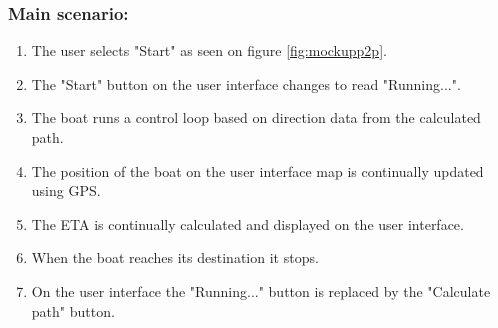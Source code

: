 \begin{framed}
	\subsubsection*{Main scenario:}
	\begin{enumerate}
		\item The user selects "Start" as seen on figure \ref{fig:mockupp2p}.
		\item The "Start" button on the user interface changes to read "Running...".
		\item The boat runs a control loop based on direction data from the calculated path.
		\item The position of the boat on the user interface map is continually updated using GPS.
		\item The ETA is continually calculated and displayed on the user interface.
		\item When the boat reaches its destination it stops.
		\item On the user interface the "Running..." button is replaced by the "Calculate path" button.
	\end{enumerate}	
\end{framed}	

